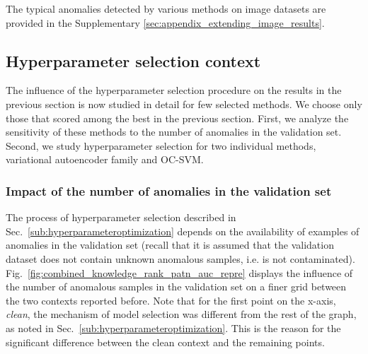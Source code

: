The typical anomalies detected by various methods on image datasets are provided in the Supplementary \ref{sec:appendix_extending_image_results}.


\subsection{Hyperparameter selection context}
\label{sec:hyperparameter_context}
The influence of the hyperparameter selection procedure on the results in the previous section is now studied in detail for few selected methods. We choose only those that scored among the best in the previous section. First, we analyze the sensitivity of these methods to the number of anomalies in the validation set. Second, we study hyperparameter selection for two individual methods, variational autoencoder family and OC-SVM.

\subsubsection{Impact of the number of anomalies in the validation set}
\begin{figure*}[hbt!]
    \centering
    
    \caption{Sensitivity of methods to the number of anomalies available in the validation set for hyperparameter selection visualized in terms of the achieved AUC aggregated over all datasets in each category (columns). The clean validation context is the left-most point on the x-axis, and the anomaly validation context (50\% of available anomalies) is the right-most point. The points in-between were obtained by selecting models with the highest precision on the reported portion (e.g. 5\%) of validation samples with the highest anomaly scores.} 
    \label{fig:combined_knowledge_rank_patn_auc_repre}
\end{figure*}

The process of hyperparameter selection described in Sec.~\ref{sub:hyperparameteroptimization} depends on the availability of examples of anomalies in the validation set (recall that it is assumed that the validation dataset does not contain unknown anomalous samples, i.e. is not contaminated). 
Fig.~\ref{fig:combined_knowledge_rank_patn_auc_repre} displays the influence of the number of anomalous samples in the validation set on a finer grid between the two contexts reported before.  Note that for the first point on the x-axis, \textit{clean}, the mechanism of model selection was different from the rest of the graph, as noted in Sec.~\ref{sub:hyperparameteroptimization}. This is the reason for the significant difference between the clean context and the remaining points.

